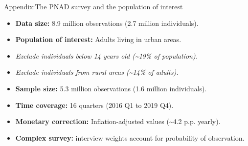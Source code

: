 \begin{frame}{Appendix:}{The PNAD survey and the population of interest}

\begin{itemize}
\item \textbf{Data size:} 8.9 million observations (2.7 million individuals).
\item \textbf{Population of interest:} Adults living in urban areas.
\end{itemize} 

\begin{itemize}
\item \textit{Exclude individuals below 14 years old (\textasciitilde 19\% of population).}
\item \textit{Exclude individuals from rural areas (\textasciitilde 14\% of adults).}
\end{itemize} 

\begin{itemize}
\item \textbf{Sample size:} 5.3 million observations (1.6 million individuals).
\item \textbf{Time coverage:} 16 quarters (2016 Q1 to 2019 Q4).
\item \textbf{Monetary correction:} Inflation-adjusted values (\textasciitilde 4.2 p.p. yearly).
\item \textbf{Complex survey:} interview weights account for probability of observation.
\end{itemize} 

\end{frame} %



